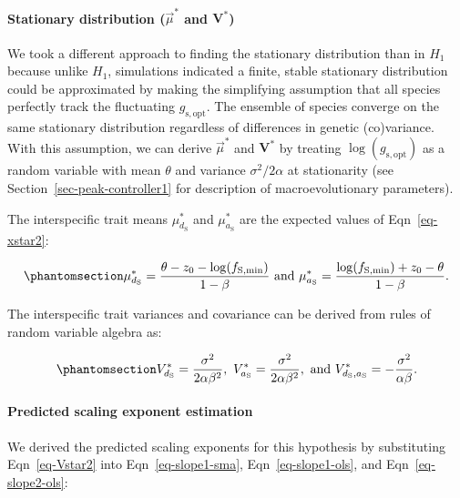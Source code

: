 \documentclass[
  letterpaper,
  DIV=11,
  numbers=noendperiod]{scrartcl}
\let\oldparagraph\paragraph
\renewcommand{\paragraph}[1]{\oldparagraph{#1}\mbox{}}
\begin{document}
\paragraph{\texorpdfstring{Stationary distribution (\(\vec{\mu}^*\) and
\(\mathbf{V}^*\))}{Stationary distribution (\textbackslash vec\{\textbackslash mu\}\^{}* and \textbackslash mathbf\{V\}\^{}*)}}\label{sec-stationary2}

We took a different approach to finding the stationary distribution than
in \(H_1\) because unlike \(H_1\), simulations indicated a finite,
stable stationary distribution could be approximated by making the
simplifying assumption that all species perfectly track the fluctuating
\(g_\mathrm{s,opt}\). The ensemble of species converge on the same
stationary distribution regardless of differences in genetic
(co)variance. With this assumption, we can derive \(\vec{\mu}^*\) and
\(\mathbf{V}^*\) by treating \(\log (g_\mathrm{s,opt})\) as a random
variable with mean \(\theta\) and variance \(\sigma^2/2 \alpha\) at
stationarity (see Section~\ref{sec-peak-controller1} for description of
macroevolutionary parameters).

The interspecific trait means \(\mu_{d_{\mathrm{S}}}^*\) and
\(\mu_{a_{\mathrm{S}}}^*\) are the expected values of
Eqn~\ref{eq-xstar2}:

\begin{equation}\phantomsection\label{eq-mustar2}{\mu_{d_{\mathrm{S}}}^* = \frac{\theta - z_0 - \log (f_\mathrm{S,min})}{1 - \beta} ~\text{and}~\mu_{a_{\mathrm{S}}}^* = \frac{\log (f_\mathrm{S,min}) + z_0 - \theta}{1 - \beta}.}\end{equation}

The interspecific trait variances and covariance can be derived from
rules of random variable algebra as:

\begin{equation}\phantomsection\label{eq-Vstar2}{V_{d_\mathrm{S}}^* = \frac{\sigma ^ 2}{2 \alpha \beta^2},~ V_{a_\mathrm{S}}^* = \frac{\sigma ^ 2}{2 \alpha \beta^2},~\text{and}~V_{d_\mathrm{S},a_\mathrm{S}}^* = -\frac{\sigma ^ 2}{\alpha \beta}.}\end{equation}

\paragraph{Predicted scaling exponent
estimation}\label{predicted-scaling-exponent-estimation-1}

We derived the predicted scaling exponents for this hypothesis by
substituting Eqn~\ref{eq-Vstar2} into Eqn~\ref{eq-slope1-sma},
Eqn~\ref{eq-slope1-ols}, and Eqn~\ref{eq-slope2-ols}:
\end{document}
